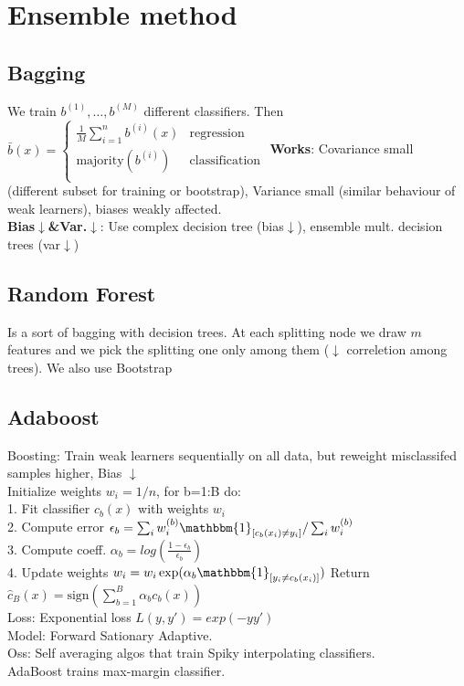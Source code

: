 \section{Ensemble method}

\subsection*{Bagging}
We train $b^{(1)}, \dots, b^{(M)}$ different classifiers. Then \(\bar{b}(x)=
\begin{cases}
	\frac{1}{M}\sum_{i = 1}^n b^{(i)}(x) & \text{regression}\\
	\text{majority}\left(b^{(i)}\right)  & \text{classification}\\
\end{cases}\)
\textbf{Works}: Covariance small (different subset for training or bootstrap), Variance small (similar behaviour of weak learners), biases weakly affected.\\
\textbf{Bias$\downarrow$\&Var.$\downarrow$}: Use complex decision tree (bias$\downarrow$), ensemble mult. decision trees (var$\downarrow$)
\subsection*{Random Forest}
Is a sort of bagging with decision trees. 
At each splitting node we draw $m$ features and we pick the splitting one only among them ($\downarrow$ correletion among trees). 
We also use Bootstrap
\subsection*{Adaboost}
Boosting: Train weak learners sequentially on all data, but reweight misclassifed samples higher, Bias $\downarrow$\\
Initialize weights $w_i = 1/n$, for b=1:B do:\\
1. Fit classifier $c_b(x)$ with weights $w_i$\\
2. Compute error $\epsilon_b = \sum_i w_i^{(b)} \mathbbm{1}_{[c_b(x_i) \not = y_i]} / \sum_i w_i^{(b)}$\\
3. Compute coeff. $\alpha_b = log(\frac{1-\epsilon_b}{\epsilon_b})$\\
4. Update weights $w_i = w_i \exp(\alpha_b \mathbbm{1}_{[y_i \not = c_b(x_i)]})$
Return $\hat{c}_B(x) = \text{sign} \left ( \sum_{b=1}^B \alpha_b c_b(x) \right )$\\
Loss: Exponential loss $L(y,y')=exp(-yy')$\\
Model: Forward Sationary Adaptive.\\
Oss: Self averaging algos that train Spiky interpolating classifiers.\\
AdaBoost trains max-margin classifier.

